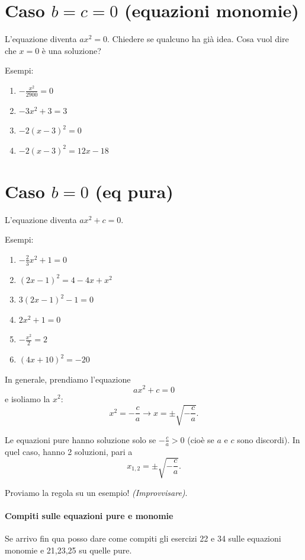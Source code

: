 \documentclass[11pt]{report}
\begin{document}
\section{Caso $b=c=0$ (equazioni monomie)}

L'equazione diventa $ax^2=0$. Chiedere se qualcuno ha già idea. Cosa vuol dire che $x=0$ è una soluzione?

Esempi:
\begin{enumerate}
    \item $-\frac{x^2}{2900}=0$
    \item $-3x^2+3=3$
    \item $-2(x-3)^2=0$
    \item $-2(x-3)^2 = 12x-18$
\end{enumerate}

\section{Caso $b=0$ (eq pura)}

L'equazione diventa $ax^2+c=0$. 


Esempi:
\begin{enumerate}
    \item $-\frac23x^2+1=0$
    \item $(2x-1)^2=4-4x+x^2$
    \item $3(2x-1)^2-1=0$
    \item $2x^2+1=0$
    \item $-\frac{x^2}{2}=2$
    \item $(4x+10)^2=-20$
\end{enumerate}

In generale, prendiamo l'equazione
$$
ax^2+c=0
$$
e isoliamo la $x^2$:
$$x^2=-\frac ca \rightarrow x=\pm\sqrt{-\frac ca} .$$

\begin{mdframed}
    Le equazioni pure hanno soluzione solo se $-\frac ca>0$ (cioè se $a$ e $c$ sono discordi). In quel caso, hanno 2 soluzioni, pari a 
    $$
    x_{1,2} = \pm\sqrt{-\frac ca}.
    $$
\end{mdframed}


Proviamo la regola su un esempio! \textit{(Improvvisare)}.

\paragraph{Compiti sulle equazioni pure e monomie}
Se arrivo fin qua posso dare come compiti gli esercizi 22 e 34 sulle equazioni monomie e 21,23,25 su quelle pure.
\end{document}
